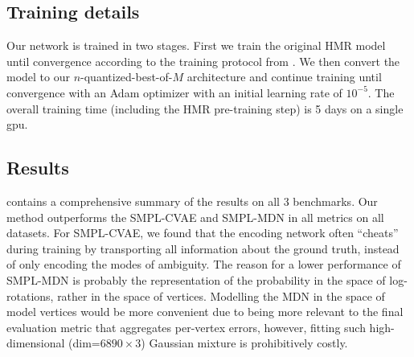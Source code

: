 

% 


\subsection{Training details}

Our network is trained in two stages. First we train the original HMR model until convergence according to the training protocol from \cite{kolotouros19convolutional}. We then convert the model to our $n$-quantized-best-of-$M$ architecture and continue training until convergence
with an Adam optimizer with an initial learning rate of $10^{-5}$. The overall training time (including the HMR pre-training step) is 5 days on a single gpu.

\subsection{Results}\label{s:exp_results}
 contains a comprehensive summary of the results on all 3 benchmarks. Our method outperforms the SMPL-CVAE and SMPL-MDN in all metrics on all datasets. 
For SMPL-CVAE, we found that the encoding network often ``cheats'' during training by transporting all information about the ground truth, instead of only encoding the modes of ambiguity.
The reason for a lower performance of SMPL-MDN is probably the representation of the probability in the space of log-rotations, rather in the space of vertices.
Modelling the MDN in the space of model vertices would be more convenient due to being more relevant to the final evaluation metric that aggregates per-vertex errors, however, fitting such high-dimensional (dim=$6890 \times 3$) Gaussian mixture is prohibitively costly. 

